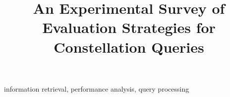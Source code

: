 \documentclass[conference]{IEEEtran}
\begin{document}
	\title{An Experimental Survey of Evaluation Strategies for Constellation Queries}

	\author{
	\and
	}

	\maketitle

	
    \begin{IEEEkeywords}
        information retrieval, performance analysis, query processing
    \end{IEEEkeywords}

	
%	
	
	
	
	
    
    \balance

	
	
\end{document}
